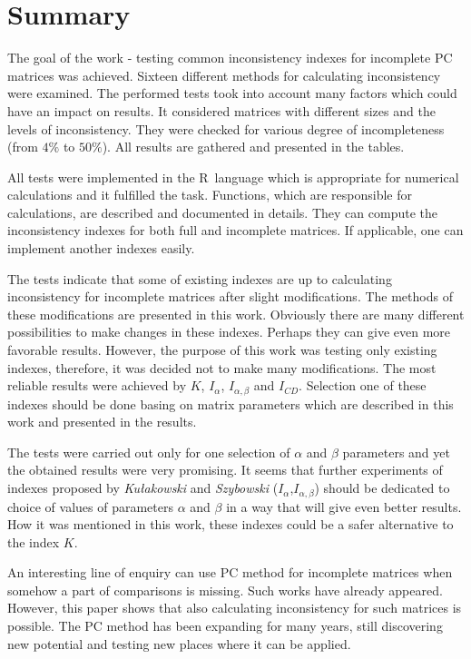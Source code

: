 \chapter{Summary}
\label{sec:summary}

The goal of the work - testing common inconsistency indexes for incomplete PC matrices was achieved. Sixteen different methods for calculating inconsistency were examined. The performed tests took into account many factors which could have an impact on results. It considered matrices with different sizes and the levels of inconsistency. They were checked for various degree of incompleteness (from $4\%$ to $50\%$). All results are gathered and presented in the tables.

All tests were implemented in the R~language which is appropriate for numerical calculations and it fulfilled the task. Functions, which are responsible for calculations, are described and documented in details. They can compute the inconsistency indexes for both full and incomplete matrices. If applicable, one can implement another indexes easily.

The tests indicate that some of existing indexes are up to calculating inconsistency for incomplete matrices after slight modifications. The methods of these modifications are presented in this work. Obviously there are many different possibilities to make changes in these indexes. Perhaps they can give even more favorable results. However, the purpose of this work was testing only existing indexes, therefore, it was decided not to make many modifications. The most reliable results were achieved by $K$, $I_{\alpha}$, $I_{\alpha,\beta}$ and $I_{CD}$. Selection one of these indexes should be done basing on matrix parameters which are described in this work and presented in the results.

The tests were carried out only for one selection of $\alpha$ and $\beta$ parameters and yet the obtained results were very promising. It seems that further experiments of indexes proposed by \textit{Kułakowski} and \textit{Szybowski} ($I_{\alpha}$,$I_{\alpha,\beta}$) should be dedicated to choice of values of parameters $\alpha$ and $\beta$ in a way that will give even better results. How it was mentioned in this work, these indexes could be a safer alternative to the index $K$.

An interesting line of enquiry can use PC method for incomplete matrices when somehow a part of comparisons is missing. Such works have already appeared. However, this paper shows that also calculating inconsistency for such matrices is possible. The PC method has been expanding for many years, still discovering new potential and testing new places where it can be applied.